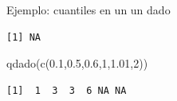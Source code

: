 \documentclass[
  letterpaper,
  DIV=11,
  numbers=noendperiod]{scrreprt}
\newenvironment{Shaded}{\begin{snugshade}}{\end{snugshade}}
\newcommand{\DecValTok}[1]{\textcolor[rgb]{0.68,0.00,0.00}{#1}}
\newcommand{\FloatTok}[1]{\textcolor[rgb]{0.68,0.00,0.00}{#1}}
\newcommand{\FunctionTok}[1]{\textcolor[rgb]{0.28,0.35,0.67}{#1}}
\newcommand{\NormalTok}[1]{\textcolor[rgb]{0.00,0.23,0.31}{#1}}
\begin{document}
\begin{Ejemplo}{Ejemplo: cuantiles en un un dado}{}
\begin{verbatim}
[1] NA
\end{verbatim}

\begin{Shaded}
\begin{Highlighting}[]
\FunctionTok{qdado}\NormalTok{(}\FunctionTok{c}\NormalTok{(}\FloatTok{0.1}\NormalTok{,}\FloatTok{0.5}\NormalTok{,}\FloatTok{0.6}\NormalTok{,}\DecValTok{1}\NormalTok{,}\FloatTok{1.01}\NormalTok{,}\DecValTok{2}\NormalTok{))}
\end{Highlighting}
\end{Shaded}

\begin{verbatim}
[1]  1  3  3  6 NA NA
\end{verbatim}

\end{Ejemplo}
\end{document}
